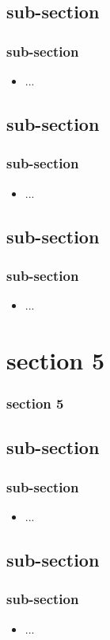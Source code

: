 \documentclass[slidetop,11pt]{beamer}
\begin{document}
\subsection{sub-section}
\begin{frame}
	\frametitle{sub-section}
	\begin{itemize}
		\item ...
	\end{itemize}
\end{frame}

\subsection{sub-section}
\begin{frame}
	\frametitle{sub-section}
	\begin{itemize}
		\item ...
	\end{itemize}
\end{frame}

\subsection{sub-section}
\begin{frame}
	\frametitle{sub-section}
	\begin{itemize}
		\item ...
	\end{itemize}
\end{frame}

\section{section 5}
\begin{frame}
	\frametitle{section 5}
	\tableofcontents[sections=5,currentsection,subsectionstyle=show/shaded/hide] %
\end{frame}

\subsection{sub-section}
\begin{frame}
	\frametitle{sub-section}
	\begin{itemize}
		\item ...
	\end{itemize}
\end{frame}

\subsection{sub-section}
\begin{frame}
	\frametitle{sub-section}
	\begin{itemize}
		\item ...
	\end{itemize}
\end{frame}
\end{document}

